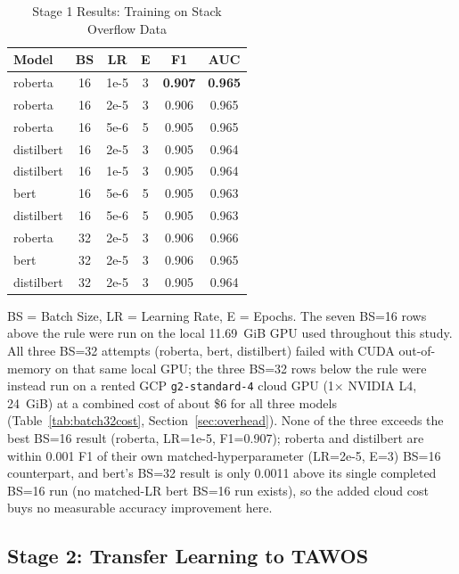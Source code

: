 \documentclass[preprint,12pt]{elsarticle}
\begin{document}
\begin{table}[t]
\centering
\begin{tabular}{lccccc}
\toprule
\textbf{Model} & \textbf{BS} & \textbf{LR} & \textbf{E} & \textbf{F1} & \textbf{AUC} \\
\midrule
roberta & 16 & 1e-5 & 3 & \textbf{0.907} & \textbf{0.965} \\
roberta & 16 & 2e-5 & 3 & 0.906 & 0.965 \\
roberta & 16 & 5e-6 & 5 & 0.905 & 0.965 \\
distilbert & 16 & 2e-5 & 3 & 0.905 & 0.964 \\
distilbert & 16 & 1e-5 & 3 & 0.905 & 0.964 \\
bert & 16 & 5e-6 & 5 & 0.905 & 0.963 \\
distilbert & 16 & 5e-6 & 5 & 0.905 & 0.963 \\
\midrule
roberta & 32 & 2e-5 & 3 & 0.906 & 0.966 \\
bert & 32 & 2e-5 & 3 & 0.906 & 0.965 \\
distilbert & 32 & 2e-5 & 3 & 0.905 & 0.964 \\
\bottomrule
\end{tabular}
\caption{Stage 1 Results: Training on Stack Overflow Data}
\label{tab:stage1}
\begin{flushleft}
\footnotesize BS = Batch Size, LR = Learning Rate, E = Epochs. The seven BS=16 rows above the rule were run on the local 11.69~GiB GPU used throughout this study. All three BS=32 attempts (roberta, bert, distilbert) failed with CUDA out-of-memory on that same local GPU; the three BS=32 rows below the rule were instead run on a rented GCP \texttt{g2-standard-4} cloud GPU (1$\times$ NVIDIA L4, 24~GiB) at a combined cost of about \$6 for all three models (Table~\ref{tab:batch32cost}, Section~\ref{sec:overhead}). None of the three exceeds the best BS=16 result (roberta, LR=1e-5, F1=0.907); roberta and distilbert are within 0.001 F1 of their own matched-hyperparameter (LR=2e-5, E=3) BS=16 counterpart, and bert's BS=32 result is only 0.0011 above its single completed BS=16 run (no matched-LR bert BS=16 run exists), so the added cloud cost buys no measurable accuracy improvement here.
\end{flushleft}
\end{table}

\subsection{Stage 2: Transfer Learning to TAWOS}
\end{document}
